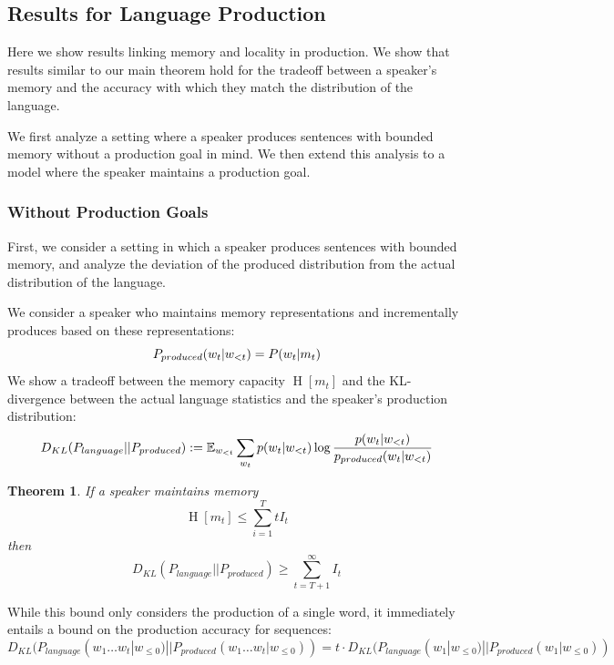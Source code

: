 \documentclass[11pt,letterpaper]{article}
\newcommand{\E}[0]{\mathbb{E}}
\newcounter{theorem}
\newtheorem{thm}[theorem]{Theorem}
\begin{document}
\subsection{Results for Language Production}

Here we show results linking memory and locality in production.
We show that results similar to our main theorem hold for the tradeoff between a speaker's memory and the accuracy with which they match the distribution of the language.

We first analyze a setting where a speaker produces sentences with bounded memory without a production goal in mind.
We then extend this analysis to a model where the speaker maintains a production goal.

\subsubsection{Without Production Goals}
First, we consider a setting in which a speaker produces sentences with bounded memory, and analyze the deviation of the produced distribution from the actual distribution of the language.

We consider a speaker who maintains memory representations and incrementally produces based on these representations:
\begin{equation}
P_{produced}(w_t|w_{<t}) = P(w_t|m_t) \\
\end{equation}
We show a tradeoff between the memory capacity $\operatorname{H}[m_t]$ and the KL-divergence between the actual language statistics and the speaker's production distribution:
\begin{equation}
D_{KL}(P_{language}||P_{produced})  := \E_{w_{<t}} \sum_{w_t} p(w_t|w_{<t}) \log \frac{p(w_t|w_{<t})}{p_{produced}(w_t|w_{<t})} \\
\end{equation}
\begin{thm}
If a speaker maintains memory
	\begin{equation}
		\operatorname{H}[m_t] \leq \sum_{i=1}^T tI_t
	\end{equation}
	then 
\begin{equation}
	D_{KL}(P_{language}||P_{produced}) \geq \sum_{t=T+1}^\infty I_t
\end{equation}
\end{thm}

While this bound only considers the production of a single word, it immediately entails a bound on the production accuracy for sequences:
\begin{equation}
	D_{KL}(P_{language}(w_1\dots w_t|w_{\leq 0})||P_{produced}(w_1\dots w_t|w_{\leq 0}))  = t \cdot D_{KL}(P_{language}(w_1|w_{\leq 0})||P_{produced}(w_1|w_{\leq 0}))
\end{equation}
\end{document}

